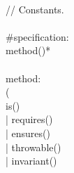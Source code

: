 \begin{bigbigpre}
 \\
// Constants. \\
 \\
#specification: \\
    method()* \\
 \\
method: \\
    ( \\
        is() \\
      | requires() \\
      | ensures() \\
      | throwable() \\
      | invariant() \\

\end{bigbigpre}

